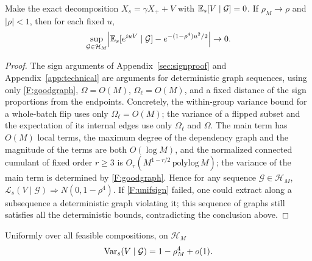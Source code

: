 \begin{lemma}\label{F:lem:unifsign}
Make the exact decomposition $X_s=\gamma X_++V$ with $\mathbb E_s[V\mid\mathcal G]=0$. If
$\rho_M\to\rho$ and $|\rho|<1$, then for each fixed $u$,
\begin{equation}
\sup_{\mathcal G\in\mathcal H_M}\Bigl|\mathbb E_s[e^{iuV}\mid\mathcal G]-e^{-(1-\rho^4)u^2/2}\Bigr|\to0.\label{F:unifsign}
\end{equation}
\end{lemma}

\begin{proof}
The sign arguments of Appendix~\ref{sec:signproof} and Appendix~\ref{app:technical} are arguments
for deterministic graph sequences, using only \eqref{F:goodgraph}, $\Omega=O(M)$,
$\Omega_\ell=O(M)$, and a fixed distance of the sign proportions from the endpoints. Concretely,
the within-group variance bound for a whole-batch flip uses only $\Omega_\ell=O(M)$; the variance
of a flipped subset and the expectation of its internal edges use only $\Omega_\ell$ and $\Omega$.
The main term has $O(M)$ local terms, the maximum degree of the dependency graph and the magnitude
of the terms are both $O(\log M)$, and the normalized connected cumulant of fixed order $r\ge3$ is
$O_r(M^{1-r/2}\,\mathrm{polylog}\,M)$; the variance of the main term is determined by
\eqref{F:goodgraph}. Hence for any sequence $\mathcal G\in\mathcal H_M$,
$\mathcal L_s(V\mid\mathcal G)\Rightarrow N(0,1-\rho^4)$. If \eqref{F:unifsign} failed, one could
extract along a subsequence a deterministic graph violating it; this sequence of graphs still
satisfies all the deterministic bounds, contradicting the conclusion above.
\end{proof}

\begin{lemma}\label{F:lem:endpoint}
Uniformly over all feasible compositions, on $\mathcal H_M$
\begin{equation}
\operatorname{Var}_s(V\mid\mathcal G)=1-\rho_M^4+o(1).\label{F:pergraphvar}
\end{equation}
\end{lemma}

